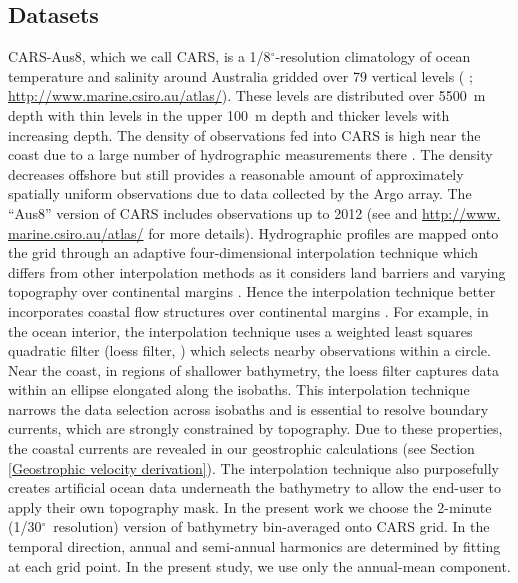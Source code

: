 \documentclass[preprint,3p,review,12pt]{elsarticle}
\newcommand{\dg}{$^{\circ}$}
\begin{document}
\subsection{Datasets} \label{Datasets}
CARS-Aus8, which we call CARS, is a 1/8\dg-resolution climatology of ocean temperature and salinity around Australia gridded over 79 vertical levels (\citeauthor{Ridgway2002} \citeyear{Ridgway2002}; \url{http://www.marine.csiro.au/atlas/}). These levels are distributed over \SI{5500}{\meter} depth with thin levels in the upper \SI{100}{\meter} depth and thicker levels with increasing depth. The density of observations fed into CARS is high near the coast due to a large number of hydrographic measurements there \citep{Ridgway2002}. The density decreases offshore but still provides a reasonable amount of approximately spatially uniform observations due to data collected by the Argo array. The ``Aus8'' version of CARS includes observations up to 2012 (see \citeauthor{Duran2015} \citeyear{Duran2015} and \url{http://www. marine.csiro.au/atlas/} for more details). Hydrographic profiles are mapped onto the grid through an adaptive four-dimensional interpolation technique which differs from other interpolation methods as it considers land barriers and varying topography over continental margins \citep{Ridgway2002}. Hence the interpolation technique better incorporates coastal flow structures over continental margins \citep{Ridgway2002}. For example, in the ocean interior, the interpolation technique uses a weighted least squares quadratic filter (loess filter, \citeauthor{Cleveland1988} \citeyear{Cleveland1988}) which selects nearby observations within a circle. Near the coast, in regions of shallower bathymetry, the loess filter captures data within an ellipse elongated along the isobaths. This interpolation technique narrows the data selection across isobaths and is essential to resolve boundary currents, which are strongly constrained by topography. Due to these properties, the coastal currents are revealed in our geostrophic calculations (see Section \ref{Geostrophic velocity derivation}). The interpolation technique also purposefully creates artificial ocean data underneath the bathymetry to allow the end-user to apply their own topography mask. In the present work we choose the 2-minute (1/30\dg~resolution) version of \citet{Smith1997} bathymetry bin-averaged onto CARS grid. In the temporal direction, annual and semi-annual harmonics are determined by fitting at each grid point. In the present study, we use only the annual-mean component.
\end{document}
